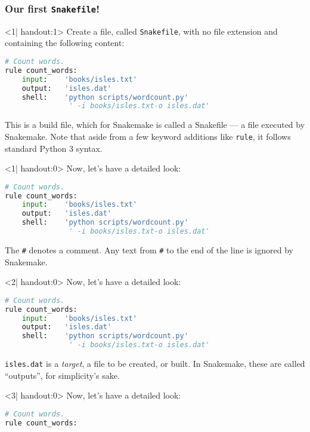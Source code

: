 \begin{frame}[fragile]
  \frametitle{Our first \texttt{Snakefile}!}
  \begin{onlyenv}<1| handout:1>
    Create a file, called \texttt{Snakefile}, with no file extension and containing the following content:
    \begin{lstlisting}[language=Python,style=Python]
# Count words.
rule count_words:
    input:    'books/isles.txt'
    output:   'isles.dat'
    shell:    'python scripts/wordcount.py' 
               ' -i books/isles.txt-o isles.dat'
    \end{lstlisting}

  This is a build file, which for Snakemake is called a Snakefile — a file executed by Snakemake. Note that aside from a few keyword additions like \texttt{rule}, it follows standard Python 3 syntax.
    \end{onlyenv}
  \begin{onlyenv}<1| handout:0>
   Now, let's have a detailed look:
   \begin{lstlisting}[language=Python,style=Python]
# Count words.
rule count_words:
    input:    'books/isles.txt'
    output:   'isles.dat'
    shell:    'python scripts/wordcount.py' 
               ' -i books/isles.txt-o isles.dat'
    \end{lstlisting}
    The \texttt{\#} denotes a comment. Any text from \texttt{\#} to the end of the line is ignored by Snakemake.
  \end{onlyenv}
  \begin{onlyenv}<2| handout:0>
   Now, let's have a detailed look:
   \begin{lstlisting}[language=Python,style=Python]
# Count words.
rule count_words:
    input:    'books/isles.txt'
    output:   'isles.dat'
    shell:    'python scripts/wordcount.py' 
               ' -i books/isles.txt-o isles.dat'
    \end{lstlisting}
    \texttt{isles.dat} is a \emph{target}, a file to be created, or built. In Snakemake, these are called “outputs”, for simplicity’s sake.
  \end{onlyenv}
  \begin{onlyenv}<3| handout:0>
   Now, let's have a detailed look:
   \begin{lstlisting}[language=Python,style=Python]
# Count words.
rule count_words:

\end{lstlisting}
\end{onlyenv}
\end{frame}
